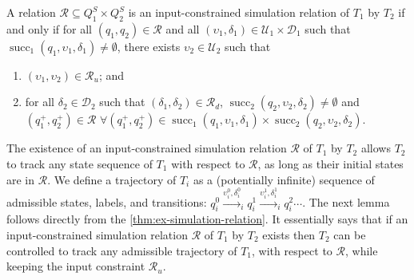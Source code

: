 \begin{definition}
  \label{thm:ex-simulation-relation}
  A relation $\mathcal{R} \subseteq Q^{S}_1 \times Q^{S}_2$ is an input-constrained simulation relation of $T_1$ by $T_2$ if and only if for all $(q_1, q_2) \in \mathcal{R}$ and all $(\upsilon_{1}, \delta_{1}) \in \mathcal{U}_{1} \times \mathcal{D}_{1}$ such that $\operatorname{succ}_{1} (q_{1}, \upsilon_{1}, \delta_{1}) \neq \emptyset$, there exists $\upsilon_{2} \in \mathcal{U}_{2}$ such that
    \begin{enumerate}
    \item $(\upsilon_{1}, \upsilon_{2}) \in \mathcal{R}_{u}$; and
    \item for all $\delta_{2} \in \mathcal{D}_{2}$ such that $(\delta_{1}, \delta_{2}) \in \mathcal{R}_{d}$, $\operatorname{succ}_{2} (q_{2}, \upsilon_{2}, \delta_{2}) \neq \emptyset$ and $(q_{1}^{+}, q_{2}^{+}) \in \mathcal{R}$ %
      $\forall (q_{1}^{+}, q_{2}^{+}) \in \operatorname{succ}_{1} (q_{1}, \upsilon_{1}, \delta_{1}) \times \operatorname{succ}_{2} (q_{2}, \upsilon_{2}, \delta_{2})$.
    \end{enumerate}
\end{definition}


The existence of an input-constrained simulation relation $\mathcal{R}$ of $T_{1}$ by $T_{2}$ allows $T_{2}$ to track any state sequence of $T_{1}$ with respect to $\mathcal{R}$, as long as their initial states are in $\mathcal{R}$.
We define a trajectory of $T_{i}$ as a (potentially infinite) sequence of admissible states, labels, and transitions: $q_{i}^{0} \xrightarrow{\upsilon_{i}^{0}, \delta_{i}^{0}}_{i} q_{i}^{1} \xrightarrow{\upsilon_{i}^{1}, \delta_{i}^{1}}_{i} q_{i}^{2} \cdots$.
The next lemma follows directly from the \cref{thm:ex-simulation-relation}.
It essentially says that if an input-constrained simulation relation $\mathcal{R}$ of $T_{1}$ by $T_2$ exists then $T_{2}$ can be controlled to track any admissible trajectory of $T_{1}$, with respect to $\mathcal{R}$, while keeping the input constraint $\mathcal{R}_{u}$.

